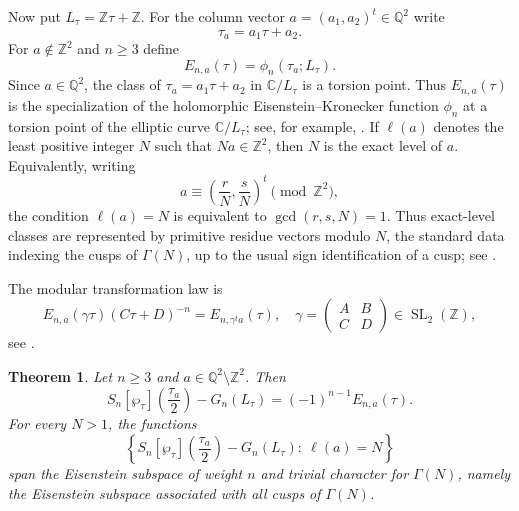 \documentclass[11pt]{amsart}
\newtheorem{thm}{Theorem}[section]
\theoremstyle{definition}
\theoremstyle{remark}
\numberwithin{equation}{section}
\begin{document}
Now put $L_\tau=\mathbb Z\tau+\mathbb Z$. For the column vector
$a=(a_1,a_2)^t\in\mathbb Q^2$ write
\[
\tau_a=a_1\tau+a_2.
\]
For $a\notin\mathbb Z^2$ and $n\geq3$ define
\begin{equation}\label{eq:Ena}
E_{n,a}(\tau)=\phi_n(\tau_a;L_\tau).
\end{equation}
Since \(a\in\mathbb Q^2\), the class of
\(\tau_a=a_1\tau+a_2\) in \(\mathbb C/L_\tau\) is a torsion point.
Thus $E_{n,a}(\tau)$
is the specialization of the holomorphic Eisenstein--Kronecker
function \(\phi_n\) at a torsion point of the elliptic curve
\(\mathbb C/L_\tau\); see, for example, \cite{weil}.
If $\ell(a)$ denotes the least positive integer $N$ such that $Na\in\mathbb Z^2$, then $N$ is the exact level of $a$. Equivalently, writing
\[
a\equiv \left(\frac rN,\frac sN\right)^t \pmod{\mathbb Z^2},
\]
the condition $\ell(a)=N$ is equivalent to $\gcd(r,s,N)=1$. Thus exact-level classes are represented by primitive residue vectors modulo $N$, the standard data indexing the cusps of $\Gamma(N)$, up to the usual sign identification of a cusp; see \cite{schoeneberg}.

The modular transformation law is
\begin{equation}\label{eq:Ena-transform}
E_{n,a}(\gamma\tau)(C\tau+D)^{-n}
=
E_{n,\gamma^t a}(\tau),
\quad
\gamma=\begin{pmatrix}A&B\\ C&D\end{pmatrix}\in\operatorname{SL}_2(\mathbb Z),
\end{equation}
 see
\cite{schoeneberg}.

\begin{thm}\label{thm:torsion-specialization}
Let $n\geq3$ and $a\in\mathbb Q^2\setminus\mathbb Z^2$. Then
\begin{equation}\label{eq:torsion-specialization}
S_n[\wp_\tau]\left(\frac{\tau_a}{2}\right)-G_n(L_\tau)
=
(-1)^{n-1}E_{n,a}(\tau).
\end{equation}
For every $N>1$, the functions
\begin{equation}\label{eq:eis-span}
\left\{
S_n[\wp_\tau]\left(\frac{\tau_a}{2}\right)-G_n(L_\tau)
:\ \ell(a)=N
\right\}
\end{equation}
span the Eisenstein subspace of weight $n$ and trivial character for
$\Gamma(N)$, namely the Eisenstein subspace associated with all cusps of
$\Gamma(N)$.
\end{thm}
\end{document}
